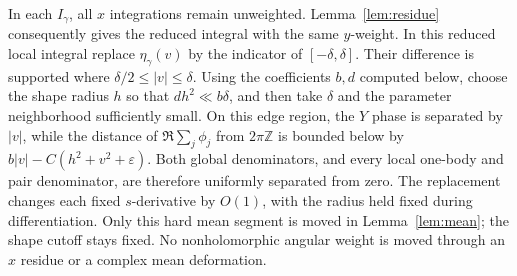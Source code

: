 \documentclass[11pt]{article}
\numberwithin{equation}{section}
\theoremstyle{definition}
\newcommand{\Z}{\mathbb Z}
\newcommand{\eps}{\varepsilon}
\begin{document}
In each \(I_\gamma\), all \(x\) integrations remain unweighted.
Lemma~\ref{lem:residue} consequently gives the reduced integral with
the same \(y\)-weight. In this reduced local integral replace
\(\eta_\gamma(v)\) by the indicator of \([-\delta,\delta]\).
Their difference is supported where \(\delta/2\le |v|\le\delta\).
Using the coefficients \(b,d\) computed below, choose the shape radius
\(h\) so that \(dh^2\ll b\delta\), and then take \(\delta\) and
the parameter neighborhood sufficiently small. On this edge region,
the \(Y\) phase is separated by \(|v|\), while the distance of
\(\Re\sum_j\phi_j\) from \(2\pi\Z\) is bounded below by
\(b|v|-C(h^2+v^2+\eps)\). Both global denominators, and every local
one-body and pair denominator, are therefore uniformly separated
from zero. The replacement changes each fixed \(s\)-derivative by
\(O(1)\), with the radius held fixed during differentiation.
Only this hard mean segment is moved in Lemma~\ref{lem:mean}; the
shape cutoff stays fixed. No nonholomorphic angular weight is moved
through an \(x\) residue or a complex mean deformation.
\end{document}
